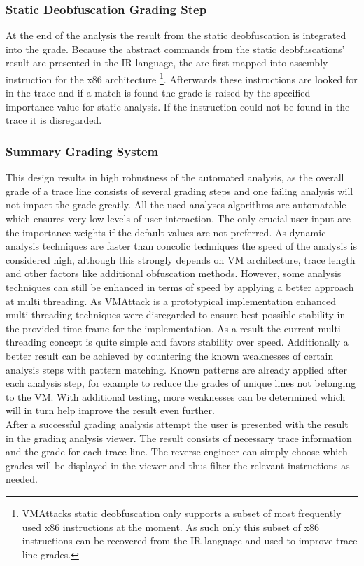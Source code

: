 \documentclass[10pt,twoside,a4paper,bibliography=totoc]{scrbook}
\begin{document}
\subsubsection{Static Deobfuscation Grading Step}
At the end of the analysis the result from the static deobfuscation is integrated into the grade. 
Because the abstract commands from the static deobfuscations' result are presented in the IR language, the are first mapped into assembly instruction for the x86 architecture \footnote{VMAttacks static deobfuscation only supports a subset of most frequently used x86 instructions at the moment. As such only this subset of x86 instructions can be recovered from the IR language and used to improve trace line grades.}. 
Afterwards these instructions are looked for in the trace and if a match is found the grade is raised by the specified importance value for static analysis.
If the instruction could not be found in the trace it is disregarded.

\subsubsection{Summary Grading System}
This design results in high robustness of the automated analysis, as the overall grade of a trace line consists of several grading steps and one failing analysis will not impact the grade greatly.
All the used analyses algorithms are automatable which ensures very low levels of user interaction. The only crucial user input are the importance weights if the default values are not preferred.
As dynamic analysis techniques are faster than concolic techniques the speed of the analysis is considered high, although this strongly depends on VM architecture, trace length and other factors like additional obfuscation methods. 
However, some analysis techniques can still be enhanced in terms of speed by applying a better approach at multi threading. 
As VMAttack is a prototypical implementation enhanced multi threading techniques were disregarded to ensure best possible stability in the provided time frame for the implementation. As a result the current multi threading concept is quite simple and favors stability over speed.
Additionally a better result can be achieved by countering the known weaknesses of certain analysis steps with pattern matching. Known patterns are already applied after each analysis step, for example to reduce the grades of unique lines not belonging to the VM. 
With additional testing, more weaknesses can be determined which will in turn help improve the result even further.\\
After a successful grading analysis attempt the user is presented with the result in the grading analysis viewer. The result consists of necessary trace information and the grade for each trace line. The reverse engineer can simply choose which grades will be displayed in the viewer and thus filter the relevant instructions as needed.
\end{document}

